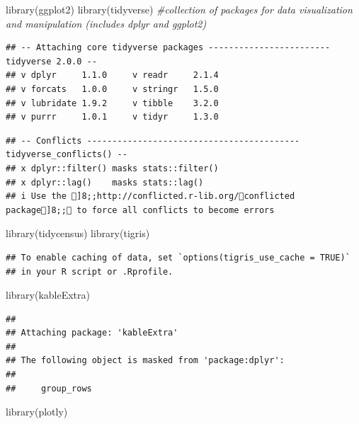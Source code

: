 \documentclass[
]{article}
\newenvironment{Shaded}{\begin{snugshade}}{\end{snugshade}}
\newcommand{\CommentTok}[1]{\textcolor[rgb]{0.56,0.35,0.01}{\textit{#1}}}
\newcommand{\FunctionTok}[1]{\textcolor[rgb]{0.00,0.00,0.00}{#1}}
\newcommand{\NormalTok}[1]{#1}
\begin{document}
\begin{Shaded}
\begin{Highlighting}[]
\FunctionTok{library}\NormalTok{(ggplot2) }
\FunctionTok{library}\NormalTok{(tidyverse) }\CommentTok{\#collection of packages for data visualization and manipulation (includes dplyr and ggplot2)}
\end{Highlighting}
\end{Shaded}

\begin{verbatim}
## -- Attaching core tidyverse packages ------------------------ tidyverse 2.0.0 --
## v dplyr     1.1.0     v readr     2.1.4
## v forcats   1.0.0     v stringr   1.5.0
## v lubridate 1.9.2     v tibble    3.2.0
## v purrr     1.0.1     v tidyr     1.3.0
\end{verbatim}

\begin{verbatim}
## -- Conflicts ------------------------------------------ tidyverse_conflicts() --
## x dplyr::filter() masks stats::filter()
## x dplyr::lag()    masks stats::lag()
## i Use the ]8;;http://conflicted.r-lib.org/conflicted package]8;; to force all conflicts to become errors
\end{verbatim}

\begin{Shaded}
\begin{Highlighting}[]
\FunctionTok{library}\NormalTok{(tidycensus)}
\FunctionTok{library}\NormalTok{(tigris)}
\end{Highlighting}
\end{Shaded}

\begin{verbatim}
## To enable caching of data, set `options(tigris_use_cache = TRUE)`
## in your R script or .Rprofile.
\end{verbatim}

\begin{Shaded}
\begin{Highlighting}[]
\FunctionTok{library}\NormalTok{(kableExtra)}
\end{Highlighting}
\end{Shaded}

\begin{verbatim}
## 
## Attaching package: 'kableExtra'
## 
## The following object is masked from 'package:dplyr':
## 
##     group_rows
\end{verbatim}

\begin{Shaded}
\begin{Highlighting}[]
\FunctionTok{library}\NormalTok{(plotly)}
\end{Highlighting}
\end{Shaded}
\end{document}

